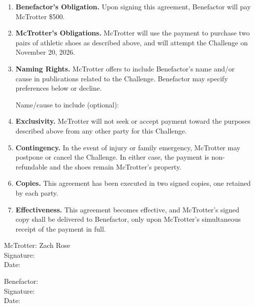 \documentclass[11pt]{article}
\begin{document}
\begin{enumerate}[leftmargin=*, label=\textbf{\arabic*.}]

\item \textbf{Benefactor's Obligation.} Upon signing this agreement, Benefactor will pay McTrotter \$500.

\item \textbf{McTrotter's Obligations.} McTrotter will use the payment to purchase two pairs of athletic shoes as described above, and will attempt the Challenge on November 20, 2026.

\item \textbf{Naming Rights.} McTrotter offers to include Benefactor's name and/or cause in publications related to the Challenge. Benefactor may specify preferences below or decline.

\medskip
Name/cause to include (optional): \underline{\hspace{6cm}}

\item \textbf{Exclusivity.} McTrotter will not seek or accept payment toward the purposes described above from any other party for this Challenge.

\item \textbf{Contingency.} In the event of injury or family emergency, McTrotter may postpone or cancel the Challenge. In either case, the payment is non-refundable and the shoes remain McTrotter's property.

\item \textbf{Copies.} This agreement has been executed in two signed copies, one retained by each party.

\item \textbf{Effectiveness.} This agreement becomes effective, and McTrotter's signed copy shall be delivered to Benefactor, only upon McTrotter's simultaneous receipt of the payment in full.

\end{enumerate}

\vspace{3em}

\noindent
\begin{minipage}[t]{0.48\textwidth}
McTrotter: Zach Rose \\[1.5em]
Signature:\enspace\underline{\hspace{5.5cm}} \\[1em]
Date:\enspace\underline{\hspace{3cm}}
\end{minipage}
\hfill
\begin{minipage}[t]{0.48\textwidth}
Benefactor:\enspace\underline{\hspace{4cm}} \\[1.5em]
Signature:\enspace\underline{\hspace{5.5cm}} \\[1em]
Date:\enspace\underline{\hspace{3cm}}
\end{minipage}
\end{document}
